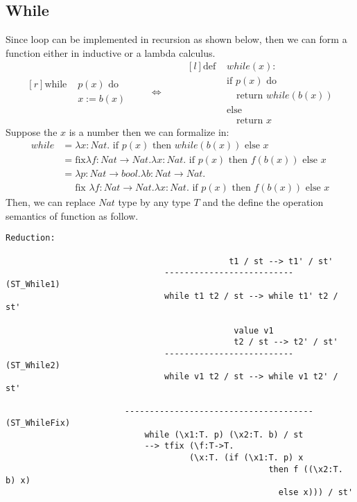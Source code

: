 \subsection{While}
Since \while loop can be implemented in recursion as shown below, then we can form a \while function either in inductive or a lambda calculus\cite{whileloop}.
\begin{equation*}
\begin{aligned}[r]
\text{while } &p(x) \text{ do} \\
&x := b(x)
\end{aligned}
\qquad\Longleftrightarrow\qquad
\begin{aligned}[l]
\text{def } &while(x): \\
&\text{if } p(x) \text{ do} \\
&\quad \text{return } while(b(x)) \\
&\text{else} \\
&\quad\text{return } x
\end{aligned}
\end{equation*}
Suppose the $x$ is a number then we can formalize \while in:
\begin{align*}
while &=  \lambda x:Nat. \text{  if  } p(x) \text{  then  } while(b(x)) \text{  else  } x\\
&=  \text{fix} \lambda f:Nat \rightarrow Nat. \lambda x:Nat. \text{  if  } p(x) \text{  then  } f(b(x)) \text{  else  } x\\
&= \lambda p:Nat \rightarrow bool. \lambda b:Nat \rightarrow Nat. \\
&\quad \text{ fix }  \lambda f:Nat \rightarrow Nat. \lambda x:Nat. \text{  if  } p(x) \text{  then  } f(b(x)) \text{  else  } x
\end{align*}
Then, we can replace $Nat$ type by any type $T$ and the define the operation semantics of \while function as follow.
\begin{lstlisting}
Reduction:

										     t1 / st --> t1' / st'
								--------------------------         (ST_While1)
								while t1 t2 / st --> while t1' t2 / st'
								
											  value v1
											  t2 / st --> t2' / st'
								--------------------------         (ST_While2)
								while v1 t2 / st --> while v1 t2' / st'
								
						-------------------------------------- (ST_WhileFix)
							while (\x1:T. p) (\x2:T. b) / st 
							--> tfix (\f:T->T. 
					       			 (\x:T. (if (\x1:T. p) x
					       							 then f ((\x2:T. b) x) 
					 		   						   else x))) / st'
\end{lstlisting}


